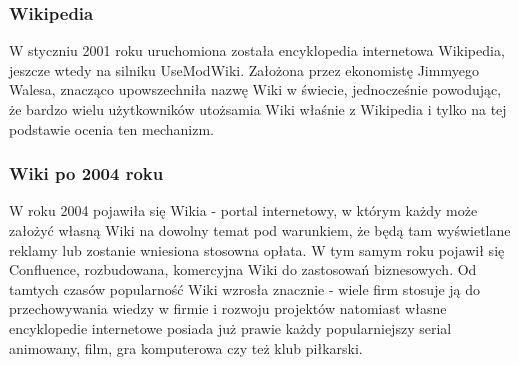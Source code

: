 \documentclass{article}
\begin{document}
	\subsubsection{Wikipedia}
	W styczniu 2001 roku uruchomiona została encyklopedia internetowa Wikipedia, jeszcze wtedy na silniku UseModWiki. Założona przez ekonomistę Jimmyego Walesa, znacząco upowszechniła nazwę Wiki w świecie, jednocześnie powodując, że bardzo wielu użytkowników utożsamia Wiki właśnie z Wikipedia i tylko na tej podstawie ocenia ten mechanizm.
	
	\subsubsection{Wiki po 2004 roku}
	W roku 2004 pojawiła się Wikia - portal internetowy, w którym każdy może założyć własną Wiki na dowolny temat pod warunkiem, że będą tam wyświetlane reklamy lub zostanie wniesiona stosowna opłata. W tym samym roku pojawił się Confluence, rozbudowana, komercyjna Wiki do zastosowań biznesowych. Od tamtych czasów popularność Wiki wzrosła znacznie - wiele firm stosuje ją do przechowywania wiedzy w firmie i rozwoju projektów natomiast własne encyklopedie internetowe posiada już prawie każdy popularniejszy serial animowany, film, gra komputerowa czy też klub piłkarski. 

% 


\end{document}
